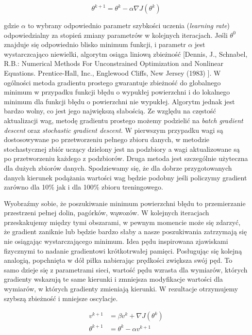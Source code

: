 \documentclass[]{article}
\theoremstyle{definition}
\begin{document}
\begin{equation}
\theta^{k+1} = \theta^{k} - \alpha \nabla J(\theta^{k})
\end{equation}


gdzie $\alpha$ to wybrany odpowiednio parametr szybkości uczenia (\textit{learning rate}) odpowiedzialny za stopień zmiany parametrów w kolejnych iteracjach. Jeśli $\theta^0$ znajduje się odpowiednio blisko minimum funkcji, i parametr $\alpha$ jest wystarczcająco niewielki, algorytm osiąga liniową zbieżność [Dennis, J., Schnabel, R.B.: Numerical Methods For Unconstrained Optimization and Nonlinear Equations. Prentice-Hall, Inc., Englewood Cliffs, New Jersey (1983)
]. W ogólności metoda gradientu prostego gwarantuje zbieżność do globalnego minimum w przypadku funkcji błędu o wypukłej powierzchni i do lokalnego minimum dla funkcji błędu o powierzchni nie wypukłej. Algorytm jednak jest bardzo wolny, co jest jego największą słabością. Ze względu na częstość aktualizacji wag, metodę gradientu prostego możemy podzielić na \textit{batch gradient descent} oraz \textit{stochastic gradient descent}. W pierwszym przypadku wagi są dostosowywane po przetworzeniu pełnego zbioru danych, w metodzie stochastycznej zbiór uczący dzielony jest na podzbiory a wagi aktualizowane są po przetworzeniu każdego z podzbiorów. Druga metoda jest szczególnie użyteczna dla dużych zbiorów danych. Spodziewamy się, że dla dobrze przygotowanych danych kierunek podążania wartości wag będzie podobny jeśli policzymy gradient zarówno dla 10\% jak i dla 100\% zbioru treningowego.


Wyobraźmy sobie, że poszukiwanie minimum powierzchni błędu to przemierzanie przestrzeni pełnej dolin, pagórków, wąwozów. W kolejnych iteracjach przeskakujemy między tymi obszarami, w pewnym momencie może się zdarzyć, że gradient zaniknie lub będzie bardzo słaby a nasze poszukiwania zatrzymają się nie osiągając wystarczającego minimum. Idea pędu inspirowana zjawiskami fizycznymi to nadanie gradientowi krótkotrwałej pamięci. Posługując się kolejną analogią, popchnięta w dół piłka nabierając prędkości zwiększa swój pęd. To samo dzieje się z parametrami sieci, wartość pędu wzrasta dla wymiarów, których gradienty wskazują te same kierunki i zmniejsza modyfikacje wartości dla wymiarów, w których gradienty zmieniają kierunki. W rezultacje otrzymujemy szybszą zbieżność i mniejsze oscylacje.

\begin{align} 
v^{k+1} &=  \beta v^{k}+ \nabla J(\theta^{k}) \\[0.4em]
\theta^{k+1} &=  \theta^{k }- \alpha v^{k+1}
\end{align}
\end{document}
